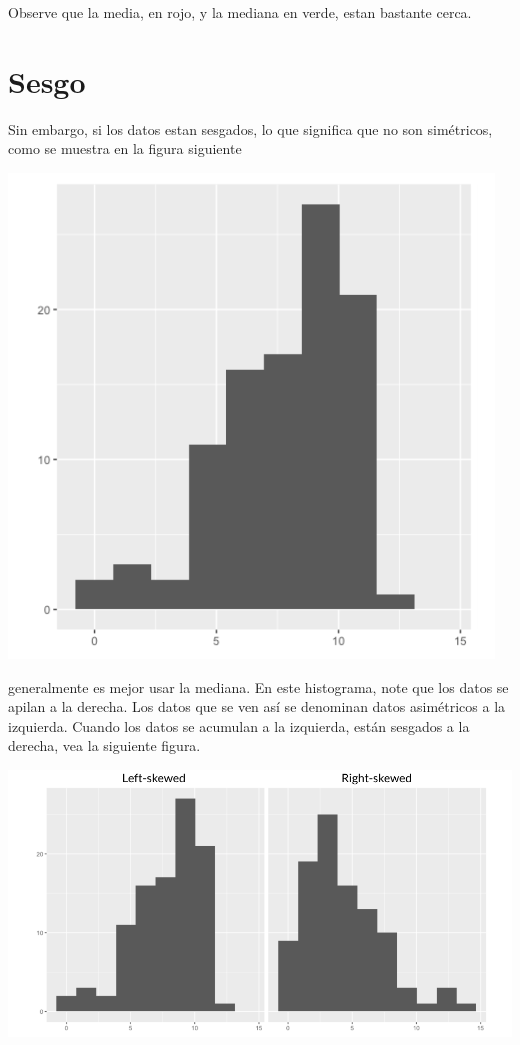 \documentclass[
  letterpaper,
  DIV=11,
  numbers=noendperiod]{scrreprt}
\begin{document}
Observe que la media, en rojo, y la mediana en verde, estan bastante
cerca.

\hypertarget{sesgo}{%
\section{Sesgo}\label{sesgo}}

Sin embargo, si los datos estan sesgados, lo que significa que no son
simétricos, como se muestra en la figura siguiente

\includegraphics{fig5.png}

generalmente es mejor usar la mediana. En este histograma, note que los
datos se apilan a la derecha. Los datos que se ven así se denominan
datos asimétricos a la izquierda. Cuando los datos se acumulan a la
izquierda, están sesgados a la derecha, vea la siguiente figura.

\includegraphics{fig6.png}
\end{document}
